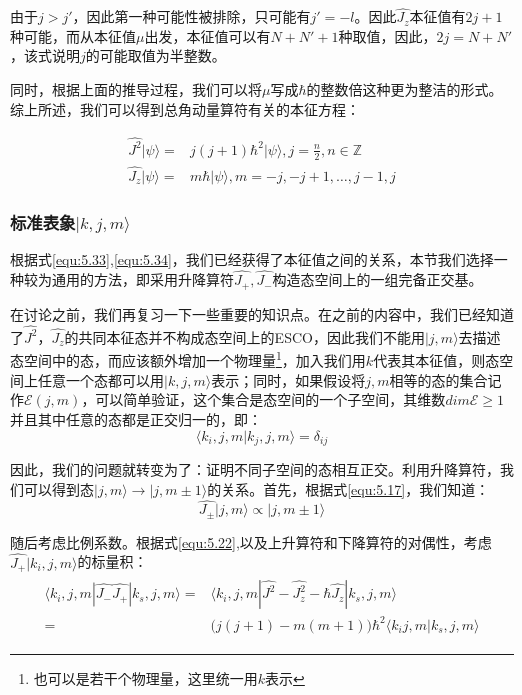         由于$j>j'$，因此第一种可能性被排除，只可能有$j'=-l$。因此$\hat{J_z}$本征值有$2j+1$种可能，而从本征值$\mu$出发，本征值可以有$N+N'+1$种取值，因此，$2j=N+N'$，该式说明$j$的可能取值为半整数。
        
        同时，根据上面的推导过程，我们可以将$\mu$写成$\hbar$的整数倍这种更为整洁的形式。综上所述，我们可以得到总角动量算符有关的本征方程：
        
        \begin{align}\label{equ:5.33}
            \hat{J^2}|\psi \rangle =&j(j+1)\hbar ^2|\psi \rangle ,j=\frac{n}{2},n\in \mathbb{Z}\\
            \hat{J_z}|\psi \rangle=&m \hbar |\psi \rangle ,m=-j,-j+1,\ldots,j-1,j
            \label{equ:5.34}
        \end{align}
        
        \subsubsection{标准表象$|k,j,m \rangle $}\label{subsubsection5:standardbasis}
        根据式\ref{equ:5.33},\ref{equ:5.34}，我们已经获得了本征值之间的关系，本节我们选择一种较为通用的方法，即采用升降算符$\hat{J_+},\hat{J_-}$构造态空间上的一组完备正交基。
        
        在讨论之前，我们再复习一下一些重要的知识点。在之前的内容中，我们已经知道了$\hat{J^2}，\hat{J_z}$的共同本征态并不构成态空间上的ESCO，因此我们不能用$|j,m\rangle$去描述态空间中的态，而应该额外增加一个物理量\footnote{也可以是若干个物理量，这里统一用$k$表示}，加入我们用$k$代表其本征值，则态空间上任意一个态都可以用$|k,j,m\rangle$表示；同时，如果假设将$j,m$相等的态的集合记作$\mathcal{E}(j,m)$，可以简单验证，这个集合是态空间的一个子空间，其维数$dim\mathcal{E}\geq1$并且其中任意的态都是正交归一的，即：
        \begin{equation}
            \langle k_i,j,m|k_j,j,m\rangle=\delta_{ij}
        \end{equation}
        
        因此，我们的问题就转变为了：证明不同子空间的态相互正交。利用升降算符，我们可以得到态$|j,m\rangle \rightarrow |j,m\pm 1\rangle$的关系。首先，根据式\ref{equ:5.17}，我们知道：
        \begin{equation}
            \hat{J_\pm }|j,m\rangle \propto |j,m\pm 1\rangle
        \end{equation}
        
        随后考虑比例系数。根据式\ref{equ:5.22},以及上升算符和下降算符的对偶性，考虑$\hat{J_+}|k_i,j,m\rangle$的标量积：
        \begin{align}
            \begin{split}
                \langle k_i,j,m|\hat{J_-}\hat{J_+}|k_s,j,m\rangle=&\langle k_i,j,m|\hat{J^2}-\hat{J_z^2}-\hbar\hat{J_z}|k_s,j,m\rangle\\
                =&\Big( j(j+1)-m(m+1)\Big)\hbar^2\langle k_i j,m|k_s,j,m\rangle
            \end{split}
        \end{align}
        

